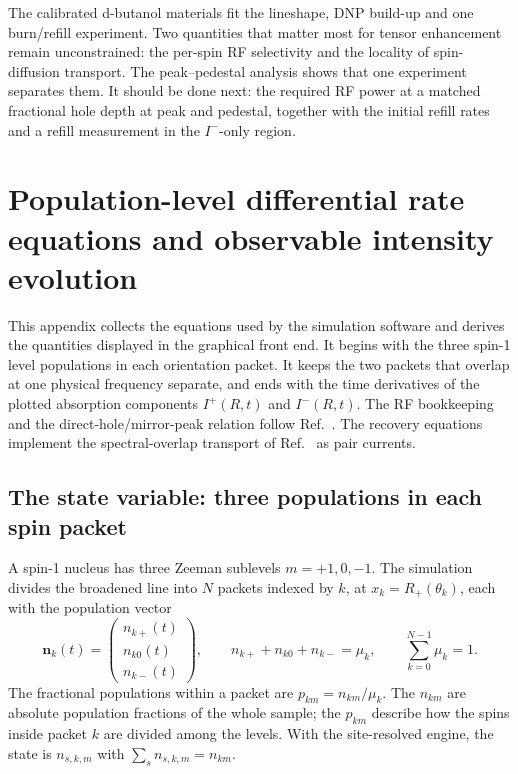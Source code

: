 \documentclass[11pt]{article}
\newcommand{\Iplus}{I^{+}}
\newcommand{\Iminus}{I^{-}}
\begin{document}
The calibrated d-butanol materials fit the lineshape, DNP build-up and one burn/refill
experiment. Two quantities that matter most for tensor enhancement remain unconstrained: the
per-spin RF selectivity and the locality of spin-diffusion transport. The peak--pedestal analysis
shows that one experiment separates them. It should be done next: the required RF power at a
matched fractional hole depth at peak and pedestal, together with the initial refill rates and a
refill measurement in the \(\Iminus\)-only region.

\appendix

\section{Population-level differential rate equations and observable intensity evolution}
\label{app:effective-rate-equations}

This appendix collects the equations used by the simulation software and derives the quantities
displayed in the graphical front end. It begins with the three spin-1 level populations in each
orientation packet. It keeps the two packets that overlap at one physical frequency separate,
and ends with the time derivatives of the plotted absorption components \(\Iplus(R,t)\) and
\(\Iminus(R,t)\). The RF bookkeeping and the direct-hole/mirror-peak relation follow
Ref.~\cite{ClementKeller2023}. The recovery equations implement the spectral-overlap transport
of Ref.~\cite{Keller2026} as pair currents.

\subsection{The state variable: three populations in each spin packet}

A spin-1 nucleus has three Zeeman sublevels \(m=+1,0,-1\). The simulation divides the broadened
line into \(N\) packets indexed by \(k\), at \(x_k=R_+(\theta_k)\), each with the population
vector
\begin{equation}
  \bm n_k(t)
  =
  \begin{pmatrix}
    n_{k+}(t)\\ n_{k0}(t)\\ n_{k-}(t)
  \end{pmatrix},
  \qquad
  n_{k+}+n_{k0}+n_{k-}=\mu_k,
  \qquad
  \sum_{k=0}^{N-1}\mu_k=1.
  \label{eq:app-packet-normalization}
\end{equation}
The fractional populations within a packet are \(p_{km}=n_{km}/\mu_k\). The \(n_{km}\) are
absolute population fractions of the whole sample; the \(p_{km}\) describe how the spins inside
packet \(k\) are divided among the levels. With the site-resolved engine, the state is
\(n_{s,k,m}\) with \(\sum_sn_{s,k,m}=n_{km}\).
\end{document}
